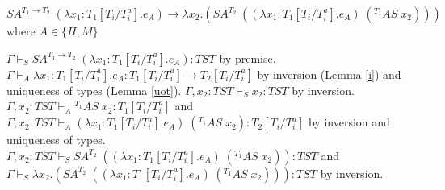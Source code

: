 \begin{case}
$SA^{T_{1}\rightarrow T_{2}}\;(\lambda x_{1}:T_{1}[T_{i}/T_{i}^{a}].e_{A})\rightarrow\lambda x_{2}.(SA^{T_{2}}\;((\lambda x_{1}:T_{1}[T_{i}/T_{i}^{a}].e_{A})\;(^{T_{1}}AS\;x_{2})))$ where $A\in\lbrace H,M\rbrace$

$\Gamma\vdash_{S}SA^{T_{1}\rightarrow T_{2}}\;(\lambda x_{1}:T_{1}[T_{i}/T_{i}^{a}].e_{A}):TST$ by premise.  $\Gamma\vdash_{A}\lambda x_{1}:T_{1}[T_{i}/T_{i}^{a}].e_{A}:T_{1}[T_{i}/T_{i}^{a}]\rightarrow T_{2}[T_{i}/T_{i}^{a}]$ by inversion (Lemma \ref{i}) and uniqueness of types (Lemma \ref{uot}).  $\Gamma,x_{2}:TST\vdash_{S}x_{2}:TST$ by inversion.  $\Gamma,x_{2}:TST\vdash_{A}{^{T_{1}}A}S\;x_{2}:T_{1}[T_{i}/T_{i}^{a}]$ and $\Gamma,x_{2}:TST\vdash_{A}(\lambda x_{1}:T_{1}[T_{i}/T_{i}^{a}].e_{A})\;(^{T_{1}}AS\;x_{2}):T_{2}[T_{i}/T_{i}^{a}]$ by inversion and uniqueness of types.  $\Gamma,x_{2}:TST\vdash_{S}SA^{T_{2}}\;((\lambda x_{1}:T_{1}[T_{i}/T_{i}^{a}].e_{A})\;(^{T_{1}}AS\;x_{2})):TST$ and $\Gamma\vdash_{S}\lambda x_{2}.(SA^{T_{2}}\;((\lambda x_{1}:T_{1}[T_{i}/T_{i}^{a}].e_{A})\;(^{T_{1}}AS\;x_{2}))):TST$ by inversion.
\end{case}